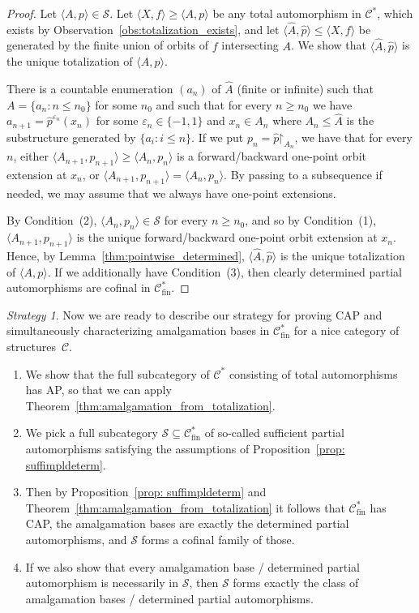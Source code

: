 \documentclass[10pt,a4paper]{article}
\theoremstyle{definition}
\theoremstyle{remark}
\newtheorem{strategy}[tw]{Strategy}
\newcommand \set [1]{\{#1\}}
\newcommand \seq [1]{\langle #1 \rangle}
\newcommand \restr [1] {\mathord{\upharpoonright}_{#1}}
\newcommand \eps {\varepsilon}
\newcommand \Su {\mathscr{S}}
\newcommand \C {\mathscr{C}}
\newcommand \fin {{\operatorname{fin}}}
\begin{document}
\begin{proof}
    Let $\seq{A, p} \in \Su$.
    Let $\seq{X, f} \geq \seq{A, p}$ be any total automorphism in $\C^*$, which exists by Observation~\ref{obs:totalization_exists}, and let $\seq{\hat{A}, \hat{p}} \leq \seq{X, f}$ be generated by the finite union of orbits of $f$ intersecting $A$.
    We show that $\seq{\hat{A}, \hat{p}}$ is the unique totalization of $\seq{A, p}$.

    There is a countable enumeration $(a_n)$ of $\hat{A}$ (finite or infinite) such that $A = \set{a_n: n \leq n_0}$ for some $n_0$ and such that for every $n \geq n_0$ we have $a_{n + 1} = \hat{p}^{\eps_n}(x_n)$ for some $\eps_n \in \set{-1, 1}$ and $x_n \in A_n$ where $A_n \leq \hat{A}$ is the substructure generated by $\set{a_i: i \leq n}$.
    If we put $p_n = \hat{p}\restr{A_n}$, we have that for every $n$, either $\seq{A_{n + 1}, p_{n + 1} }\geq \seq{A_n, p_n}$ is a forward/backward one-point orbit extension at $x_n$, or $\seq{A_{n + 1}, p_{n + 1}} = \seq{A_n, p_n}$.
    By passing to a subsequence if needed, we may assume that we always have one-point extensions.
    
    By Condition~(2), $\seq{A_n, p_n} \in \Su$ for every $n \geq n_0$, and so by Condition~(1), $\seq{A_{n + 1}, p_{n + 1}}$ is the unique forward/backward one-point orbit extension at $x_n$.
    Hence, by Lemma~\ref{thm:pointwise_determined}, $\seq{\hat{A}, \hat{p}}$ is the unique totalization of $\seq{A, p}$.
    If we additionally have Condition~(3), then clearly determined partial automorphisms are cofinal in $\C^*_\fin$.
\end{proof}





\begin{strategy} \label{strategy}
Now we are ready to describe our strategy for proving CAP and simultaneously characterizing amalgamation bases in $\C^*_\fin$ for a nice category of structures~$\C$.
\begin{enumerate}
    \item We show that the full subcategory of $\C^*$ consisting of total automorphisms has AP, so that we can apply Theorem~\ref{thm:amalgamation_from_totalization}.
    \item We pick a full subcategory $\Su \subseteq \C^*_\fin$ of so-called sufficient partial automorphisms satisfying the assumptions of Proposition~\ref{prop: suffimpldeterm}.
    \item Then by Proposition~\ref{prop: suffimpldeterm} and Theorem~\ref{thm:amalgamation_from_totalization} it follows that $\C^*_\fin$ has CAP, the amalgamation bases are exactly the determined partial automorphisms, and $\Su$ forms a cofinal family of those.
    \item If we also show that every amalgamation base / determined partial automorphism is necessarily in $\Su$, then $\Su$ forms exactly the class of amalgamation bases / determined partial automorphisms.
\end{enumerate}
\end{strategy}
\end{document}
